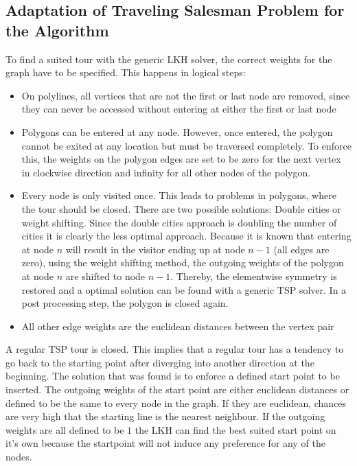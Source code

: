 \subsection{Adaptation of Traveling Salesman Problem for the Algorithm}

To find a suited tour with the generic LKH solver, the correct weights for the graph have to be specified. This happens in logical steps:

\begin{itemize}
\item On polylines, all vertices that are not the first or last node are removed, since they can never be accessed without entering at either the first or last node 
\item Polygons can be entered at any node. However, once entered, the polygon cannot be exited at any location but must be traversed completely. To enforce this, the weights on the polygon edges are set to be zero for the next vertex in clockwise direction and infinity for all other nodes of the polygon.
\item Every node is only visited once. This leads to problems in polygons, where the tour should be closed. There are two possible solutions: Double cities or weight shifting. Since the double cities approach is doubling the number of cities it is clearly the less optimal approach. Because it is known that entering at node $n$ will result in the visitor ending up at node $n-1$ (all edges are zero), using the weight shifting method, the outgoing weights of the polygon at node $n$ are shifted to node $n-1$. Thereby, the elementwise symmetry is restored and a optimal solution can be found with a generic TSP solver. In a post processing step, the polygon is closed again.
\item All other edge weights are the euclidean distances between the vertex pair
\end{itemize}

A regular TSP tour is closed. This implies that a regular tour has a tendency to go back to the starting point after diverging into another direction at the beginning. The solution that was found is to enforce a defined start point to be inserted. The outgoing weights of the start point are either euclidean distances or defined to be the same to every node in the graph. If they are euclidean, chances are very high that the starting line is the nearest neighbour. If the outgoing weights are all defined to be $1$ the LKH can find the best suited start point on it's own because the startpoint will not induce any preference for any of the nodes.

